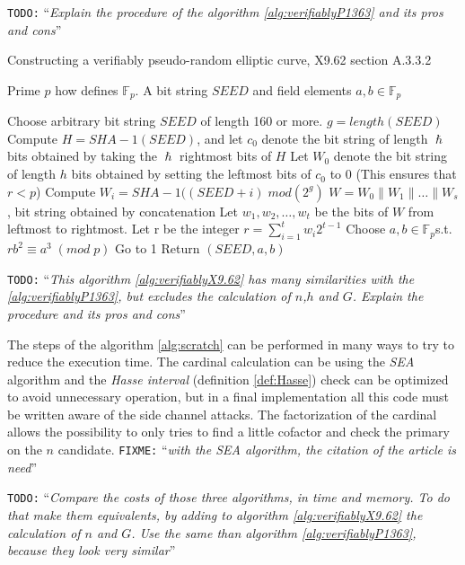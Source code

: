 \documentclass[10pt,a4paper,twoside]{llncs}
\newcommand{\todo}[1]{\texttt{\color{red}TODO:} ``\emph{#1}''}
\newcommand{\fixme}[1]{\texttt{\color{red}FIXME:} ``\emph{#1}''}
\newcommand{\Fp}{\ensuremath{\mathbb{F}_p}}%
\begin{document}
\todo{Explain the procedure of the algorithm \ref{alg:verifiablyP1363} and its pros and cons}

\begin{algorithm}
  \caption{Constructing a verifiably pseudo-random elliptic curve, X9.62 section A.3.3.2}\label{alg:verifiablyX9.62}
  \begin{algorithmic}[1]
    \REQUIRE Prime $p$ how defines \Fp.
    \ENSURE A bit string $SEED$ and field elements $a,b\in$\Fp

    \STATE Choose arbitrary bit string $SEED$ of length 160 or more. $g=length(SEED)$
    \STATE Compute $H=SHA-1(SEED)$, and let $c_0$ denote the bit string of length $\hslash$ bits obtained by taking the $\hslash$ rightmost bits of $H$
    \STATE Let $W_0$ denote the bit string of length $h$ bits obtained by setting the leftmost bits of $c_0$ to $0$ (This ensures that $r<p$)
      \STATE Compute $W_i=SHA-1((SEED+i)\;mod(2^g)$
    \ENDFOR
    \STATE $W=W_0\|W_1\|\ldots\|W_s$, bit string obtained by concatenation
    \STATE Let $w_1,w_2,\ldots,w_t$ be the bits of $W$ from leftmost to rightmost. Let r be the integer $r=\displaystyle\sum\limits_{i=1}^t w_i 2^{t-1} $
    \STATE Choose $a,b\in$\Fp s.t. $rb^2\equiv a^3\;(mod\;p)$
      \STATE Go to 1
    \ENDIF
    \STATE Return $(SEED,a,b)$
  \end{algorithmic}
\end{algorithm}

\todo{This algorithm \ref{alg:verifiablyX9.62} has many similarities with the \ref{alg:verifiablyP1363}, but excludes the calculation of $n$,$h$ and $G$. Explain the procedure and its pros and cons}

The steps of the algorithm \ref{alg:scratch} can be performed in many ways to try to reduce the execution time. The cardinal calculation can be using the \emph{SEA} algorithm  and the \emph{Hasse interval} (definition \ref{def:Hasse}) check can be optimized to avoid unnecessary operation, but in a final implementation all this code must be written aware of the side channel attacks. The factorization of the cardinal allows the possibility to only tries to find a little cofactor and check the primary on the $n$ candidate.
\fixme{with the SEA algorithm, the citation of the article is need}

\todo{Compare the costs of those three algorithms, in time and memory. To do that make them equivalents, by adding to algorithm \ref{alg:verifiablyX9.62} the calculation of $n$ and $G$. Use the same than algorithm \ref{alg:verifiablyP1363}, because they look very similar}
\end{document}
